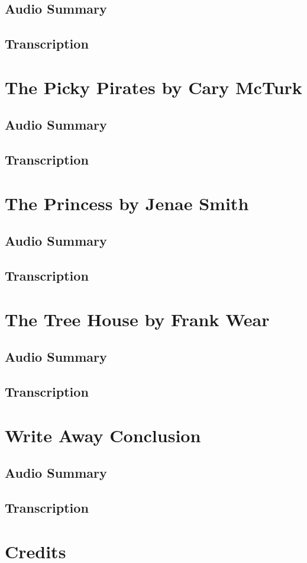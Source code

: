 \subsection{Audio Summary}

\subsection{Transcription}

\section{The Picky Pirates by Cary McTurk}

\subsection{Audio Summary}

\subsection{Transcription}

\section{The Princess by Jenae Smith}

\subsection{Audio Summary}

\subsection{Transcription}

\section{The Tree House by Frank Wear}

\subsection{Audio Summary}

\subsection{Transcription}

\section{Write Away Conclusion}

\subsection{Audio Summary}

\subsection{Transcription}

\section{Credits}